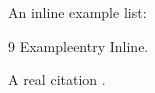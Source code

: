 \documentclass{article}
\begin{document}
An inline example list:
\begin{thebibliography}{9}
 Exampleentry Inline.
\end{thebibliography}
A real citation \cite{knuth}.


\end{document}
